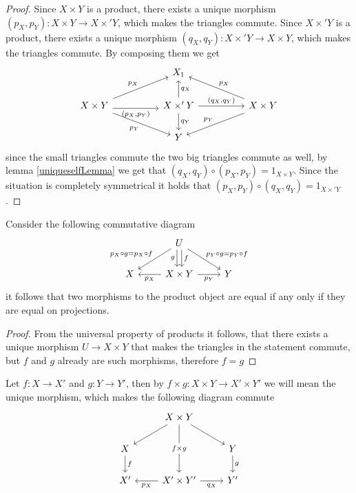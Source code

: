 \begin{proof}[Proof]
    Since $X\times Y$ is a product, there exists a unique morphism $(p_X,p_Y): X\times Y \to X\times' Y$, which
    makes the triangles commute. Since 
    $X\times' Y $ is a product, there exists a unique morphism $(q_X, q_Y): X\times' Y \to X\times Y$, which makes the 
    triangles commute. By composing them we get 
    \[\begin{tikzcd}
	&& {X_1} \\
	{X\times Y} && {X\times' Y} && {X\times Y} \\
	&& Y
	\arrow["{{p_{X}}}", from=2-1, to=1-3]
	\arrow["{(p_X,p_Y)}"', shift right, from=2-1, to=2-3]
	\arrow["{{p_{Y}}}"', from=2-1, to=3-3]
	\arrow["{{q_{X}}}"', from=2-3, to=1-3]
	\arrow["{(q_X,q_Y)}", from=2-3, to=2-5]
	\arrow["{{q_{Y}}}", from=2-3, to=3-3]
	\arrow["{p_X}"', from=2-5, to=1-3]
	\arrow["{p_Y}"', from=2-5, to=3-3]
    \end{tikzcd}\]
    since the small triangles commute the two big triangles commute as well, by lemma \ref{uniqueselfLemma} we get
    that $(q_X,q_Y)\circ(p_X,p_Y) = 1_{X\times Y}$. Since the situation is completely symmetrical it holds that 
    $(p_X,p_Y)\circ (q_X,q_Y) = 1_{X\times' Y}$.
\end{proof}
\begin{lemma}
    \label{equalonprojLemma}
    Consider the following commutative diagram 
    \[\begin{tikzcd}
	& U \\
	X & {X\times Y} & Y
	\arrow["{p_X\circ g = p_X\circ f}"', from=1-2, to=2-1]
	\arrow["f", shift left, from=1-2, to=2-2]
	\arrow["g"', shift right, from=1-2, to=2-2]
	\arrow["{p_Y\circ g =p_Y\circ f}", from=1-2, to=2-3]
	\arrow["{p_X}", from=2-2, to=2-1]
	\arrow["{p_Y}"', from=2-2, to=2-3]
\end{tikzcd}\]
    it follows that two morphisms to the product object are equal if any only if they are equal on projections.
\end{lemma}
\begin{proof}[Proof]
    From the universal property of products it follows, that there exists a unique morphism $U\to X\times Y$
    that makes the triangles in the statement commute, but $f$ and $g$ already are such morphisms, therefore
    $f=g$
\end{proof}
\begin{definition}
    Let $f: X\to X'$ and $g: Y\to Y'$, then by $f\times g: X\times Y \to X'\times Y'$ we will mean
    the unique morphism, which makes the following diagram commute
    \[\begin{tikzcd}
	& {X\times Y} \\
	X && Y \\
	{X'} & {X'\times Y'} & {Y'}
	\arrow[from=1-2, to=2-1]
	\arrow[from=1-2, to=2-3]
	\arrow["{f\times g}"{description}, from=1-2, to=3-2]
	\arrow["f", from=2-1, to=3-1]
	\arrow["g", from=2-3, to=3-3]
	\arrow["{p_X}", from=3-2, to=3-1]
	\arrow["{q_X}"', from=3-2, to=3-3]
\end{tikzcd}\]
\end{definition}
